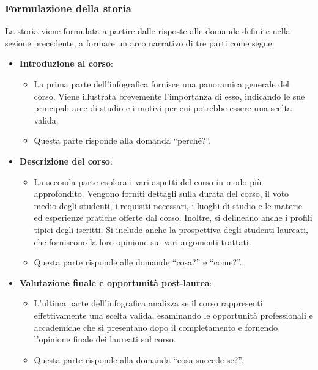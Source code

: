 \subsubsection{Formulazione della storia}\label{subsubsec:app_storia}
La storia viene formulata a partire dalle risposte alle domande definite nella sezione precedente, a formare un arco narrativo di tre parti come segue:
\begin{itemize}
    \item \textbf{Introduzione al corso}:
    \begin{itemize}
        \item La prima parte dell'infografica fornisce una panoramica generale del corso. Viene illustrata brevemente l'importanza di esso, indicando le sue principali aree di studio e 
        i motivi per cui potrebbe essere una scelta valida. 
        \item Questa parte risponde alla domanda ``perché?''.
    \end{itemize}
    \item \textbf{Descrizione del corso}:
    \begin{itemize}
        \item La seconda parte esplora i vari aspetti del corso in modo più approfondito. Vengono forniti dettagli sulla durata del corso, il voto medio degli studenti, i requisiti necessari, i luoghi di studio e 
        le materie ed esperienze pratiche offerte dal corso. Inoltre, si delineano anche i profili tipici degli iscritti.
        Si include anche la prospettiva degli studenti laureati, che forniscono la loro opinione sui vari argomenti trattati.
        \item Questa parte risponde alle domande ``cosa?'' e ``come?''.
    \end{itemize} 
    \item \textbf{Valutazione finale e opportunità post-laurea}:
    \begin{itemize}
        \item L'ultima parte dell'infografica analizza se il corso rappresenti effettivamente una scelta valida, esaminando le opportunità professionali e accademiche che si presentano dopo il completamento e fornendo 
        l'opinione finale dei laureati sul corso.
        \item Questa parte risponde alla domanda ``cosa succede se?''.
    \end{itemize}
\end{itemize}

